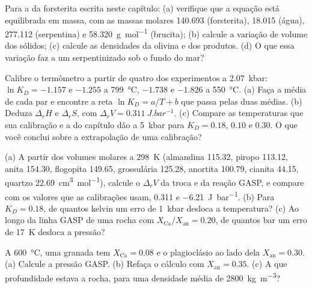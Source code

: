 \begin{exercise}[$\star$]\label{exo:b2:pt-paths:4}
Para a  da forsterita escrita neste capítulo: (a) verifique que a
equação está equilibrada em massa, com as massas molares 140.693 (forsterita), 18.015 (água),
277.112 (serpentina) e \qty{58.320}{g.mol^{-1}} (brucita); (b) calcule a variação de
volume dos sólidos; (c) calcule as densidades da olivina e dos produtos.
(d) O que essa variação faz a um  serpentinizado sob o fundo do mar?
\end{exercise}

\begin{exercise}[$\star\star$]\label{exo:b2:pt-paths:5}
Calibre o termômetro a partir de quatro dos experimentos a \qty{2.07}{kbar}: $\ln K_D =
-1.157$ e $-1.255$ a \qty{799}{\celsius}, $-1.738$ e $-1.826$ a \qty{550}{\celsius}.
(a) Faça a média de cada par e encontre a reta $\ln K_D = a/T + b$ que passa pelas duas médias.
(b) Deduza $\Delta_r H$ e $\Delta_r S$, com $\Delta_r V = \qty{0.311}{J.bar^{-1}}$.
(c) Compare as temperaturas que sua calibração e a do capítulo dão a
\qty{5}{kbar} para $K_D = 0.18$, $0.10$ e $0.30$. O que você conclui sobre a
extrapolação de uma calibração?
\end{exercise}

\begin{exercise}[$\star\star$]\label{exo:b2:pt-paths:6}
(a) A partir dos volumes molares a \qty{298}{K} (almandina 115.32, piropo 113.12, anita
154.30, flogopita 149.65, grossulária 125.28, anortita 100.79, cianita 44.15, quartzo
\qty{22.69}{cm^3.mol^{-1}}), calcule o $\Delta_r V$ da troca e da reação
GASP, e compare com os valores que as calibrações usam, \num{0.311} e
\qty{-6.21}{J.bar^{-1}}. (b) Para $K_D = 0.18$, de quantos kelvin um erro de
\qty{1}{kbar} desloca a temperatura? (c) Ao longo da linha GASP de uma rocha com
$X_{\text{Ca}}/X_{\text{an}} = 0.20$, de quantos bar um erro de \qty{17}{K} desloca
a pressão?
\end{exercise}

\begin{exercise}[$\star\star$]\label{exo:b2:pt-paths:7}
A \qty{600}{\celsius}, uma granada tem $X_{\text{Ca}} = 0.08$ e o plagioclásio ao lado dela
$X_{\text{an}} = 0.30$. (a) Calcule a pressão GASP. (b) Refaça o cálculo com $X_{\text{an}} =
0.35$. (c) A que profundidade estava a rocha, para uma densidade média de \qty{2800}{kg.m^{-3}}?
\end{exercise}

